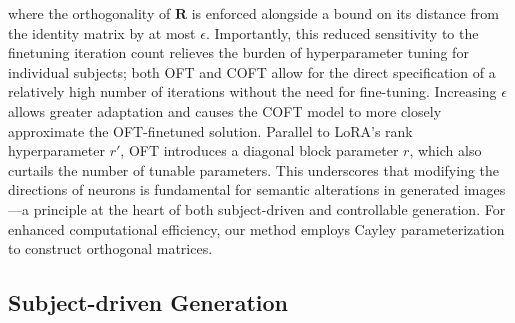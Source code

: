 where the orthogonality of $\bm{R}$ is enforced alongside a bound on its distance from the identity matrix by at most $\epsilon$. Importantly, this reduced sensitivity to the finetuning iteration count relieves the burden of hyperparameter tuning for individual subjects; both OFT and COFT allow for the direct specification of a relatively high number of iterations without the need for fine-tuning. Increasing $\epsilon$ allows greater adaptation and causes the COFT model to more closely approximate the OFT-finetuned solution. Parallel to LoRA's rank hyperparameter $r'$, OFT introduces a diagonal block parameter $r$, which also curtails the number of tunable parameters. This underscores that modifying the directions of neurons is fundamental for semantic alterations in generated images—a principle at the heart of both subject-driven and controllable generation. For enhanced computational efficiency, our method employs Cayley parameterization to construct orthogonal matrices. \subsection{Subject-driven Generation}

